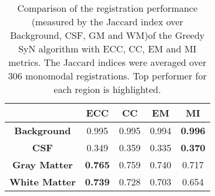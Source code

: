 \begin{table}[h!]
  \centering
  {\small
    \begin{tabular}{ccccc}
    \toprule
    \textbf{} & \textbf{ECC} & \textbf{CC} & \textbf{EM} & \multicolumn{1}{c}{\textbf{MI}} \\
    \midrule
    \textbf{Background}  & 0.995 & 0.995 & 0.994& \textbf{0.996} \\
    \textbf{CSF}         & 0.349 & 0.359 & 0.335& \textbf{0.370} \\
    \textbf{Gray Matter} & \textbf{0.765} & 0.759 & 0.740 & 0.717 \\
    \textbf{White Matter} & \textbf{0.739} & 0.728 & 0.703 & 0.654 \\
    \bottomrule
    \end{tabular}%
    \caption{{\small Comparison of the registration performance (measured by the Jaccard index over Background, CSF, GM and WM)of the Greedy SyN algorithm with ECC, CC, EM and MI metrics. The Jaccard indices were averaged over 306 monomodal registrations. Top performer for each region is highlighted.}}
  \label{tab:monomodal_results_segTri_fill}}%
\end{table}%
